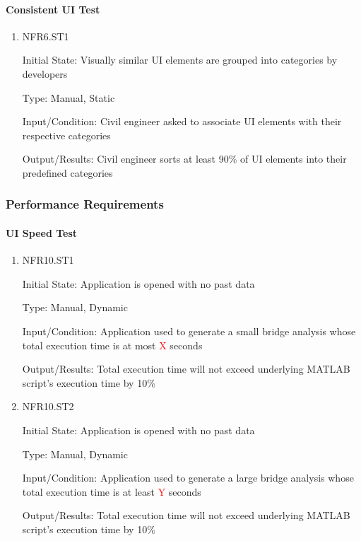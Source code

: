 \documentclass[12pt, titlepage]{article}
\begin{document}
\paragraph{Consistent UI Test}

\begin{enumerate}

\item{NFR6.ST1\\}

Initial State: Visually similar UI elements are grouped into categories by developers

Type: Manual, Static

Input/Condition: Civil engineer asked to associate UI elements with their respective categories

Output/Results: Civil engineer sorts at least 90\% of UI elements into their predefined categories

\end{enumerate}

\subsubsection{Performance Requirements}

\paragraph{UI Speed Test}

\begin{enumerate}

\item{NFR10.ST1\\}

Initial State: Application is opened with no past data

Type: Manual, Dynamic

Input/Condition: Application used to generate a small bridge analysis whose total execution time is at most \textcolor{red}{X} seconds

Output/Results: Total execution time will not exceed underlying MATLAB script's execution time by 10\%

\item{NFR10.ST2\\}

Initial State: Application is opened with no past data

Type: Manual, Dynamic

Input/Condition: Application used to generate a large bridge analysis whose total execution time is at least \textcolor{red}{Y} seconds

Output/Results: Total execution time will not exceed underlying MATLAB script's execution time by 10\%

\end{enumerate}
\end{document}
